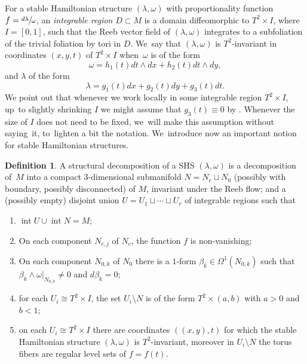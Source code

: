 \documentclass[JEP,XML,SOM,Unicode,NoEqCountersInSection,NoFloatCountersInSection,published]{cedram}
\theoremstyle{definition}
\newtheorem{defi}[theorem]{Definition}
\begin{document}
For a stable Hamiltonian structure $(\lambda,\omega)$ with proportionality function $f=\sfrac{d\lambda}{\omega}$, an \textit{integrable region} $D\subset M$ is a domain diffeomorphic to $T^2\times I$, where $I=[0,1]$, such that the Reeb vector field of $(\lambda,\omega)$ integrates to a subfoliation of the trivial foliation by tori in $D$. We~say that $(\lambda,\omega)$ is $T^2$-invariant in coordinates $(x,y,t)$ of $T^2\times I$ when~$\omega$ is of the form
\begin{equation}\label{eq-omegaonreg}
\omega= h_1(t) dt\wedge dx + h_2(t) dt\wedge dy,
\end{equation}
and $\lambda$ of the form
\begin{equation}\label{eq-lambdaonreg}
\lambda = g_1(t) dx + g_2(t) dy + g_3(t)dt.
\end{equation}
We point out that whenever we work locally in some integrable region $T^2\times I$, up~to slightly shrinking $I$ we might assume that $g_3(t)\equiv 0$ by \cite[Lem.\,3.9]{CV1}. Whenever the size of $I$ does not need to be fixed, we~will make this assumption without saying~it, to~lighten a bit the notation. We~introduce now an important notion for stable Hamiltonian structures.
\begin{defi}\label{defn-strucdecom}
A structural decomposition of a SHS $(\lambda,\omega)$ is a decomposition of~$M$ into a compact $3$-dimensional submanifold $N=N_c \sqcup N_0$ (possibly with boundary, possibly disconnected) of $M$, invariant under the Reeb flow; and a (possibly empty) disjoint union $U=U_1\sqcup \cdots\sqcup U_r$ of integrable regions such that
\begin{enumerate}
\item\label{defn-strucdecom1} $\operatorname{int}U \cup \operatorname{int}N=M$;
\item\label{defn-strucdecom2} On each component $N_{c,j}$ of $N_c$, the function $f$ is non-vanishing;
\item\label{defn-strucdecom3} On each component $N_{0,k}$ of $N_0$ there is a $1$-form $\beta_k \in \Omega^1(N_{0,k})$ such that $\beta_k\wedge \omega|_{N_{0,k}}\neq 0$ and $d\beta_k=0$;
\item\label{defn-strucdecom4} for each $U_i\cong T^2\times I$, the set $U_i\setminus N$ is of the form $T^2\times (a,b)$ with $a>0$ and $b<1$;
\item\label{defn-strucdecom5} on each $U_i\cong T^2\times I$ there are coordinates $((x,y),t)$ for which the stable Hamiltonian structure $(\lambda,\omega)$ is $T^2$-invariant, moreover in $U_i\setminus N$ the torus fibers are regular level sets of $f=f(t)$.
\end{enumerate}
\end{defi}
\end{document}
